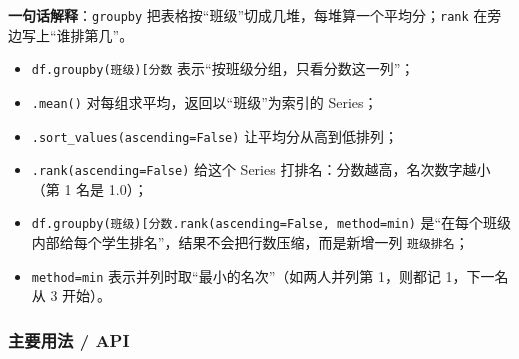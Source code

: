 \textbf{一句话解释}：\texttt{groupby}
把表格按``班级''切成几堆，每堆算一个平均分；\texttt{rank}
在旁边写上``谁排第几''。

\begin{itemize}
\tightlist
\item
  \texttt{df.groupby(\textquotesingle{}班级\textquotesingle{}){[}\textquotesingle{}分数\textquotesingle{}{]}}
  表示``按班级分组，只看分数这一列''；
\item
  \texttt{.mean()} 对每组求平均，返回以``班级''为索引的 Series；
\item
  \texttt{.sort\_values(ascending=False)} 让平均分从高到低排列；
\item
  \texttt{.rank(ascending=False)} 给这个 Series
  打排名：分数越高，名次数字越小（第 1 名是 1.0）；
\item
  \texttt{df.groupby(\textquotesingle{}班级\textquotesingle{}){[}\textquotesingle{}分数\textquotesingle{}{]}.rank(ascending=False,\ method=\textquotesingle{}min\textquotesingle{})}
  是``在每个班级内部给每个学生排名''，结果不会把行数压缩，而是新增一列
  \texttt{班级排名}；
\item
  \texttt{method=\textquotesingle{}min\textquotesingle{}}
  表示并列时取``最小的名次''（如两人并列第 1，则都记 1，下一名从 3
  开始）。
\end{itemize}

\subsubsection{主要用法 / API}\label{ux4e3bux8981ux7528ux6cd5-api-18}

